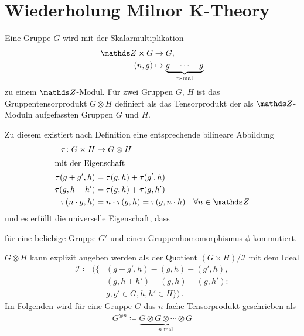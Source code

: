 \documentclass[ngerman,fontsize=11pt, paper=a4, parskip=half, titlepage=true, toc=bib]{scrartcl}
\begin{document}
\maketitle
\tableofcontents


\section{Wiederholung Milnor K-Theory}

\begin{Bem}[Gruppentensorprodukt]
  Eine Gruppe $G$ wird mit der Skalarmultiplikation
  \begin{align*}
    \Z \times G &\to G,\\
    (n,g)&\mapsto \underbrace{g+\dotsb+g}_{\scriptsize\text{$n$-mal}}
  \end{align*}
  zu einem $\Z$-Modul.
  Für zwei Gruppen $G$, $H$ ist das 
  Gruppentensorprodukt $G\otimes H$
  definiert als das Tensorprodukt der als $\Z$-Moduln
  aufgefassten Gruppen $G$ und $H$.

  Zu diesem existiert nach Definition eine 
  entsprechende bilineare Abbildung
  \begin{align*}
    \tau\colon G\times H&\rightarrow G\otimes H\\
    \intertext{mit der Eigenschaft}
    \tau(g+g',h) &= \tau(g,h)+\tau(g',h)\\
    \tau(g,h+h') &= \tau(g,h)+\tau(g,h')\\
    \tau(n\cdot g, h) &= n\cdot \tau(g,h)= \tau(g,n\cdot h)\quad
                        \forall n \in\Z
  \end{align*}
  und es erfüllt die universelle Eigenschaft, dass
  \begin{center}
  \end{center}
  für eine beliebige Gruppe $G'$ und einen Gruppenhomomorphismus $\phi$
  kommutiert.

  $G\otimes H$ kann explizit angeben werden als der Quotient
  $(G\times H) / \mathcal{I}$ mit dem Ideal 
  \begin{align*}
    \mathcal{I}\coloneqq \big(
    \big\{&(g+g',h)-(g,h)-(g',h), \\
          &(g,h+h')-(g,h)-(g,h') \colon\\
          &g,g'\in G, h,h'\in H \big\}
            \big)\,.
  \end{align*}
  Im Folgenden wird für eine Gruppe $G$ das $n$-fache Tensorprodukt
  geschrieben als
  \begin{gather*}
    G^{\otimes n}
    \coloneqq \underbrace{G\otimes G\otimes\dotsb\otimes G}_{n\text{-mal}}
  \end{gather*}
\end{Bem}
\end{document}
